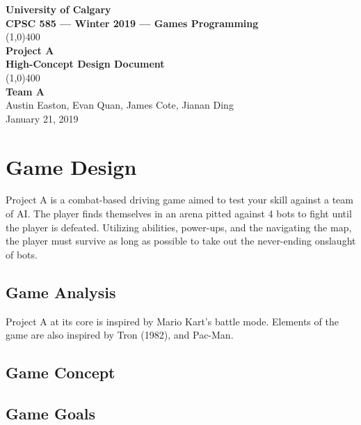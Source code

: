 \documentclass{article}
\newcommand{\name}{Project A}
\newcommand{\team}{Team A}
\newcommand{\botcount}{4}
\theoremstyle{definition}
\begin{document}
\begin{titlepage}
  \begin{center}
    \vspace*{1cm}
    \Large{\textbf{University of Calgary}}\\
    \Large{\textbf{CPSC 585 --- Winter 2019 --- Games Programming}}\\
    \vfill
    \line(1,0){400}\\[1mm]
    \huge{\textbf{\name{}}}\\
    \large{\textbf{High-Concept Design Document}}\\
    \line(1,0){400}\\
    \vfill
    \Large{\textbf{\team{}}}\\
    \Large{Austin Easton, Evan Quan, James Cote, Jianan Ding}\\
    \large{January 21, 2019}
  \end{center}
\end{titlepage}
\setcounter{page}{0}
\tableofcontents
{}
\break{}

\section{Game Design}

\name{} is a combat-based driving game aimed to test your skill against a team
of AI\@. The player finds themselves in an arena pitted against \botcount{}
bots to fight until the player is defeated. Utilizing abilities, power-ups, and
the navigating the map, the player must survive as long as possible to take out
the never-ending onslaught of bots.

\subsection{Game Analysis}

\name{} at its core is inspired by Mario Kart's battle mode. Elements of the
game are also inspired by Tron (1982), and Pac-Man.

\subsection{Game Concept}
\subsection{Game Goals}
\end{document}
